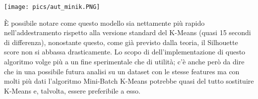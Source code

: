 \documentclass[12pt,oneside]{article}
\begin{document}
\begin{enumerate}
    \texttt{[image: pics/aut\_minik.PNG]}
    
    \begin{justify}
    È possibile notare come questo modello sia nettamente più rapido nell’addestramento rispetto alla versione standard del K-Means (quasi 15 secondi di differenza), nonostante questo, come già previsto dalla teoria, il Silhouette score non si abbassa drasticamente. Lo scopo di dell’implementazione di questo algoritmo volge più a un fine sperimentale che di utilità; c’è anche però da dire che in una possibile futura analisi su un dataset con le stesse features ma con molti più dati l’algoritmo Mini-Batch K-Means potrebbe quasi del tutto sostituire K-Means e, talvolta, essere preferibile a esso.
    \end{justify}
    \end{enumerate}
\end{document}
